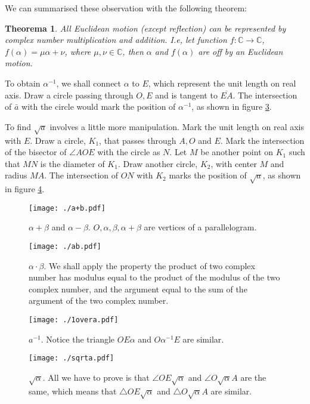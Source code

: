 \documentclass[12pt, a4paper]{article}
\newtheorem{theorem}{Theorema}[section]
\theoremstyle{definition}
\theoremstyle{remark}
\newcommand{\bb}[1]{\mathbb{#1}}
\begin{document}
We can summarised these observation with the following theorem:

\begin{theorem}\label{thm:euclideanFunction}
	All Euclidean motion (except reflection) can be represented by complex number multiplication and addition. I.e, let function $f : \bb{C} \rightarrow  \bb{C}$, $f(\alpha) = \mu \alpha + \nu$, where $\mu, \nu \in \bb{C}$, then $\alpha$ and $f(\alpha)$ are off by an Euclidean motion. 
\end{theorem}

To obtain $\alpha^{-1}$, we shall connect $\alpha$ to $E$, which represent the unit length on real axis. Draw a circle passing through $O, E$ and is tangent to $\overline{EA}$. The intersection of $\bar{a}$ with the circle would mark the position of $\alpha^{-1}$, as shown in figure \ref{fig:1overa}.

To find $\sqrt{a}$ involves a little more manipulation. Mark the unit length on real axis with $E$. 
Draw a circle, $K_1$, that passes through $A, O$ and $E$. 
Mark the intersection of the bisector of $\angle AOE$ with the circle as $N$. Let $M$ be another point on $K_1$ such that $MN$ is the diameter of $K_1$.
Draw another circle, $K_2$, with center $M$ and radius $MA$. The intersection of $ON$ with $K_2$ marks the position of $\sqrt{a}$, as shown in figure \ref{fig:sqrta}.

\begin{figure}
	\centering
	\texttt{[image: ./a+b.pdf]}
	\caption{$\alpha + \beta$ and $\alpha - \beta$. $O, \alpha, \beta, \alpha + \beta$ are vertices of a parallelogram.}
	\label{fig:A plus B}
\end{figure}
\begin{figure}
	\centering
	\texttt{[image: ./ab.pdf]}
	\caption{$\alpha \cdot \beta$. We shall apply the property the product of two complex
		number has modulus equal to the product of the modulus of the two complex number, and the argument equal to the sum of the argument of the two complex number.
	}
	\label{fig:A times B}
\end{figure}%

\begin{figure}[htbp]
	\centering
		\texttt{[image: ./1overa.pdf]}
		\caption{$a^{-1}$. Notice the triangle $OE \alpha$ and $O \alpha^{-1} E$ are similar.}
	\label{fig:1overa}
\end{figure}

\begin{figure}[htbp]
		\centering
		\texttt{[image: ./sqrta.pdf]}
		\caption{$\sqrt{\alpha}$. All we have to prove is that $\angle OE \sqrt{\alpha}$ and $\angle O \sqrt{\alpha} A$ are the same, which means 
			that $\triangle OE\sqrt{\alpha}$ and $\triangle O \sqrt{\alpha} A$ are similar.
		}
		\label{fig:sqrta}
\end{figure}
\end{document}
